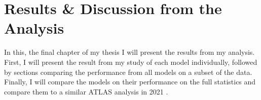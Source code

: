 \chapter{Results \& Discussion from the Analysis}\label{subsec:ResDisc}
In this, the final chapter of my thesis I will present the results from my analysis. First,
I will present the result from my study of each model individually, followed by sections 
comparing the performance from all models on a subset of the data. Finally, I will compare 
the models on their performance on the full statistics and compare them to a similar \ac{ATLAS} 
analysis in 2021 \cite{atlas_search_2021}.

